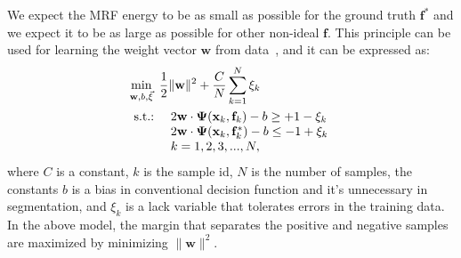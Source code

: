 \documentclass[10pt,journal,compsoc]{newIEEEtran}
\begin{document}
We expect the MRF energy to be as small as possible for the ground truth $\mathbf{f}^*$ and we expect it to be as large as possible for other non-ideal $\mathbf{f}$.
This principle can be used for learning the weight vector $\mathbf{w}$ from data~\cite{Taskar05LargeMargin,Tsochantaridis05LargeMarginSSVM}, and it can be expressed as:\vspace{-3mm}\begin{equation}\label{EQ:2C_SSVM}
\begin{split}
&\min_{\mathbf{w},b,\vec{\xi}}~ {1\over2}\|\mathbf{w}\|^2 + {C\over N}\sum_{k=1}^N \xi_k \\
& \begin{array}{rl}
                  \hbox{s.t.:}&~ 2\mathbf{w}\cdot\mathbf{\Psi}(\mathbf{x}_k,\mathbf{f}_k)-b\geq +1 - \xi_k %
                   \\
                   &~2\mathbf{w}\cdot\mathbf{\Psi}(\mathbf{x}_k,\mathbf{f}_k^*)-b\leq -1 + \xi_k\\ %
                   &~k=1,2,3,...,N,
\end{array}
\end{split}
\end{equation}
where $C$ is a constant, $k$ is the sample id, $N$ is the number of samples, the constants $b$ is a bias in conventional decision function and it's unnecessary in segmentation, and $\xi_k$ is a lack variable that tolerates errors in the training data. In the above model, the margin that separates the positive and negative samples are maximized by minimizing $\|\mathbf{w}\|^2$.%
\end{document}
